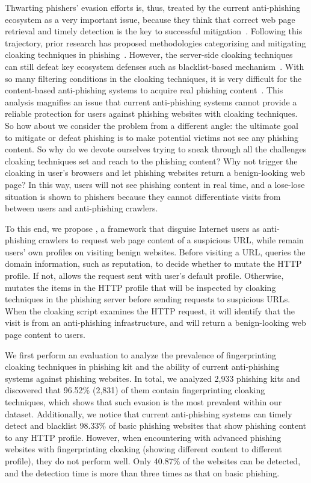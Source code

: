 Thwarting phishers' evasion efforts is, thus, treated by the current anti-phishing ecosystem as a very important issue,
because they think that correct web page retrieval and timely detection is the key to successful mitigation~\cite{oest2020sunrise, zhang2021crawlphish}.
Following this trajectory, prior research has proposed methodologies categorizing and mitigating cloaking techniques in phishing~\cite{oest2018inside, oest2019phishfarm, zhang2021crawlphish}.
However, the server-side cloaking techniques can still defeat key ecosystem defenses such as blacklist-based mechanism~\cite{oest2019phishfarm}.
With so many filtering conditions in the cloaking techniques,
it is very difficult for the content-based anti-phishing systems to acquire real phishing content~\cite{oest2018inside, oest2020phishtime}.
This analysis magnifies an issue that current anti-phishing systems cannot provide a reliable protection for users against phishing websites with cloaking techniques.
So how about we consider the problem from a different angle:
the ultimate goal to mitigate or defeat phishing is to make potential victims not see any phishing content.
So why do we devote ourselves trying to sneak through all the challenges cloaking techniques set and reach to the phishing content?
Why not trigger the cloaking in user's browsers and let phishing websites return a benign-looking web page?
In this way, users will not see phishing content in real time, and a lose-lose situation is shown to phishers because they cannot differentiate visits from between users and anti-phishing crawlers.

To this end, we propose \spartacus, a framework that disguise Internet users as anti-phishing crawlers to request web page content of a suspicious URL, while remain users' own profiles on visiting benign websites.
Before visiting a URL, \spartacus queries the domain information, such as reputation, to decide whether to mutate the HTTP profile.
If not, \spartacus allows the request sent with user's default profile.
Otherwise, \spartacus mutates the items in the HTTP profile that will be inspected by cloaking techniques in the phishing server before sending requests to suspicious URLs.
When the cloaking script examines the HTTP request, it will identify that the visit is from an anti-phishing infrastructure, and will return a benign-looking web page content to users.

We first perform an evaluation to analyze the prevalence of fingerprinting cloaking techniques in phishing kit and the ability of current anti-phishing systems against phishing websites.  
In total, we analyzed 2,933 phishing kits and discovered that 96.52\% (2,831) of them contain fingerprinting cloaking techniques, which shows that such evasion is the most prevalent within our dataset.
Additionally, we notice that current anti-phishing systems can timely detect and blacklist 98.33\% of basic phishing websites that show phishing content to any HTTP profile.
However, when encountering with advanced phishing websites with fingerprinting cloaking (showing different content to different profile), they do not perform well.
Only 40.87\% of the websites can be detected, and the detection time is more than three times as that on basic phishing.

